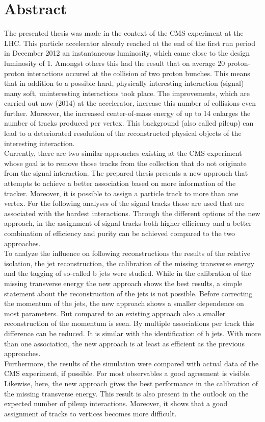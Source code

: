 \chapter*{Abstract}

The presented thesis was made in the context of the CMS experiment at the LHC. This particle accelerator already reached at the end of the first run period in December 2012 an instantaneous luminosity, which came close to the design luminosity of 1\percms{}. Amongst others this had the result that on average 20 proton-proton interactions occured at the collision of two proton bunches. This means that in addition to a possible hard, physically interesting interaction (signal) many soft, uninteresting interactions took place. The improvements, which are carried out now (2014) at the accelerator, increase this number of collisions even further. Moreover, the increased center-of-mass energy of up to 14\TeV{} enlarges the number of tracks produced per vertex. This background (also called pileup) can lead to a deteriorated resolution of the reconstructed physical objects of the interesting interaction.\\
Currently, there are two similar approaches existing at the CMS experiment whose goal is to remove those tracks from the collection that do not originate from the signal interaction. The prepared thesis presents a new approach that attempts to achieve a better association based on more information of the tracker. Moreover, it is possible to assign a particle track to more than one vertex. For the following analyses of the signal tracks those are used that are associated with the hardest interactions. Through the different options of the new approach, in the assignment of signal tracks both higher efficiency and a better combination of efficiency and purity can be achieved compared to the two approaches. \\
To analyze the influence on following reconstructions the results of the relative isolation, the jet reconstruction, the calibration of the missing transverse energy and the tagging of so-called b jets were studied. While in the calibration of the missing transverse energy the new approach shows the best results, a simple statement about the reconstruction of the jets is not possible. Before correcting the momentum of the jets, the new approach shows a smaller dependence on most parameters. But compared to an existing approach also a smaller reconstruction of the momentum is seen. By multiple associations per track this difference can be reduced. It is similar with the identification of b jets. With more than one association, the new approach is at least as efficient as the previous approaches. \\
Furthermore, the results of the simulation were compared with actual data of the CMS experiment, if possible. For most observables a good agreement is visible. Likewise, here, the new approach gives the best performance in the calibration of the missing transverse energy. This result is also present in the outlook on the expected number of pileup interactions. Moreover, it shows that a good assignment of tracks to vertices becomes more difficult.
